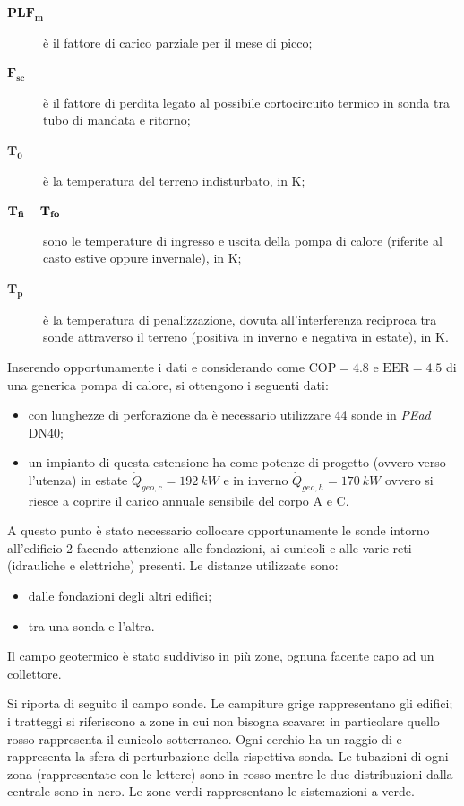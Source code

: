\begin{description}
	\item[$\mathbf{PLF_m}$] è il fattore di carico parziale per il mese di picco;
	\item[$\mathbf{F_{sc}}$] è il fattore di perdita legato al possibile cortocircuito termico in sonda tra tubo di mandata e ritorno;
	\item[$\mathbf{T_0}$] è la temperatura del terreno indisturbato, in \si{K};
	\item[$\mathbf{T_{fi}} \-- \mathbf{T_{fo}}$] sono le temperature di ingresso e uscita della pompa di calore (riferite al casto estive oppure invernale), in \si{K};
	\item[$\mathbf{T_p}$] è la temperatura di penalizzazione, dovuta all'interferenza reciproca tra sonde attraverso il terreno (positiva in inverno e negativa in estate), in \si{K}.
\end{description}
Inserendo opportunamente i dati e considerando come $\mathrm{COP}=\num{4.8}$ e $\mathrm{EER}=\num{4.5}$ di una generica pompa di calore, si ottengono i seguenti dati:
\begin{itemize}
	\item con lunghezze di perforazione da  è necessario utilizzare \num{44} sonde in \emph{PEad} DN40;
	\item un impianto di questa estensione ha come potenze di progetto (ovvero verso l'utenza) in estate $\dot{Q}_{geo,c}=\SI{192}{kW}$ e in inverno $\dot{Q}_{geo,h}=\SI{170}{kW}$ ovvero si riesce a coprire il carico annuale sensibile del corpo A e C.
\end{itemize}
A questo punto è stato necessario collocare opportunamente le sonde intorno all'edificio 2 facendo attenzione alle fondazioni, ai cunicoli e alle varie reti (idrauliche e elettriche) presenti. Le distanze utilizzate sono:
\begin{itemize}
	\item {} dalle fondazioni degli altri edifici;
	\item {} tra una sonda e l'altra.
\end{itemize}
Il campo geotermico è stato suddiviso in più zone, ognuna facente capo ad un collettore. 

Si riporta di seguito il campo sonde. Le campiture grige rappresentano gli edifici; i tratteggi si riferiscono a zone in cui non bisogna scavare: in particolare quello rosso rappresenta il cunicolo sotterraneo. Ogni cerchio ha un raggio di  e rappresenta la sfera di perturbazione della rispettiva sonda. Le tubazioni di ogni zona (rappresentate con le lettere) sono in rosso mentre le due distribuzioni dalla centrale sono in nero. Le zone verdi rappresentano le sistemazioni a verde.

